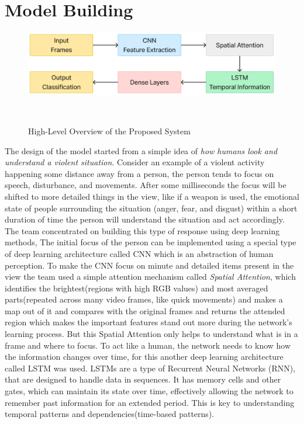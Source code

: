 \section{Model Building}


\begin{figure}[h!]
    \centering
    \includegraphics[width=0.9\linewidth]{Images/sys_high_level_overview.jpg}
    \caption{High-Level Overview of the Proposed System}\
    \label{fig:HighLevelOverview}
\end{figure}

\vspace{-5mm}

\noindent The design of the model started from a simple idea of \textit{how humans look and understand a violent situation}. Consider an example of a violent activity happening some distance away from a person, the person tends to focus on speech, disturbance, and movements. After some milliseconds the focus will be shifted to more detailed things in the view, like if a weapon is used, the emotional state of people surrounding the situation (anger, fear, and disgust) within a short duration of time the person will understand the situation and act accordingly. The team concentrated on building this type of response using deep learning methods, The initial focus of the person can be implemented using a special type of deep learning architecture called CNN which is an abstraction of human perception. To make the CNN focus on minute and detailed items present in the view the team used a simple attention mechanism called \textit{Spatial Attention}, which identifies the brightest(regions with high RGB values) and most averaged parts(repeated across many video frames, like quick movements) and makes a map out of it and compares with the original frames and returns the attended region which makes the important features stand out more during the network's learning process. But this Spatial Attention only helps to understand what is in a frame and where to focus. To act like a human, the network needs to know how the information changes over time, for this another deep learning architecture called LSTM was used. LSTMs are a type of 
Recurrent Neural Networks (RNN), that are designed to handle data in sequences. It has memory cells and other gates, which can maintain its state over time, effectively allowing the network to remember past information for an extended period. This is key to understanding temporal patterns and dependencies(time-based patterns).

